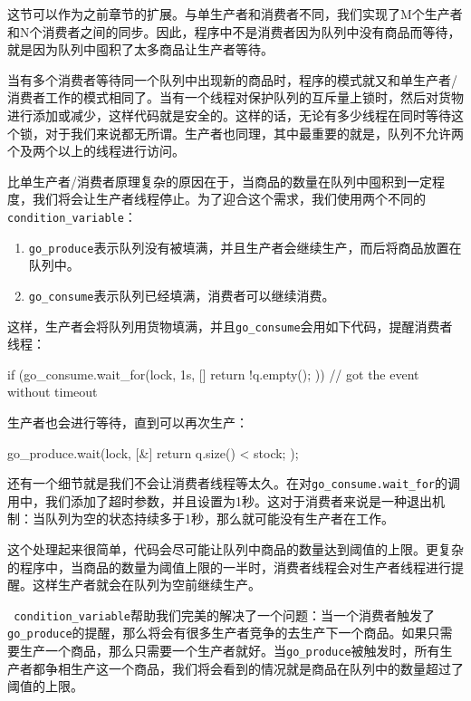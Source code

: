 
这节可以作为之前章节的扩展。与单生产者和消费者不同，我们实现了M个生产者和N个消费者之间的同步。因此，程序中不是消费者因为队列中没有商品而等待，就是因为队列中囤积了太多商品让生产者等待。

当有多个消费者等待同一个队列中出现新的商品时，程序的模式就又和单生产者/消费者工作的模式相同了。当有一个线程对保护队列的互斥量上锁时，然后对货物进行添加或减少，这样代码就是安全的。这样的话，无论有多少线程在同时等待这个锁，对于我们来说都无所谓。生产者也同理，其中最重要的就是，队列不允许两个及两个以上的线程进行访问。

比单生产者/消费者原理复杂的原因在于，当商品的数量在队列中囤积到一定程度，我们将会让生产者线程停止。为了迎合这个需求，我们使用两个不同的\texttt{condition\_variable}：

\begin{enumerate}
\item \texttt{go\_produce}表示队列没有被填满，并且生产者会继续生产，而后将商品放置在队列中。

\item \texttt{go\_consume}表示队列已经填满，消费者可以继续消费。

\end{enumerate}

这样，生产者会将队列用货物填满，并且\texttt{go\_consume}会用如下代码，提醒消费者线程：

\begin{codebox}[cpp]
if (go_consume.wait_for(lock, 1s, [] { return !q.empty(); })) {
    // got the event without timeout
}
\end{codebox}

生产者也会进行等待，直到可以再次生产：

\begin{codebox}[cpp]
go_produce.wait(lock, [&] { return q.size() < stock; });
\end{codebox}

还有一个细节就是我们不会让消费者线程等太久。在对\texttt{go\_consume.wait\_for}的调用中，我们添加了超时参数，并且设置为1秒。这对于消费者来说是一种退出机制：当队列为空的状态持续多于1秒，那么就可能没有生产者在工作。

这个处理起来很简单，代码会尽可能让队列中商品的数量达到阈值的上限。更复杂的程序中，当商品的数量为阈值上限的一半时，消费者线程会对生产者线程进行提醒。这样生产者就会在队列为空前继续生产。

\texttt{ condition\_variable}帮助我们完美的解决了一个问题：当一个消费者触发了\texttt{go\_produce}的提醒，那么将会有很多生产者竞争的去生产下一个商品。如果只需要生产一个商品，那么只需要一个生产者就好。当\texttt{go\_produce}被触发时，所有生产者都争相生产这一个商品，我们将会看到的情况就是商品在队列中的数量超过了阈值的上限。

